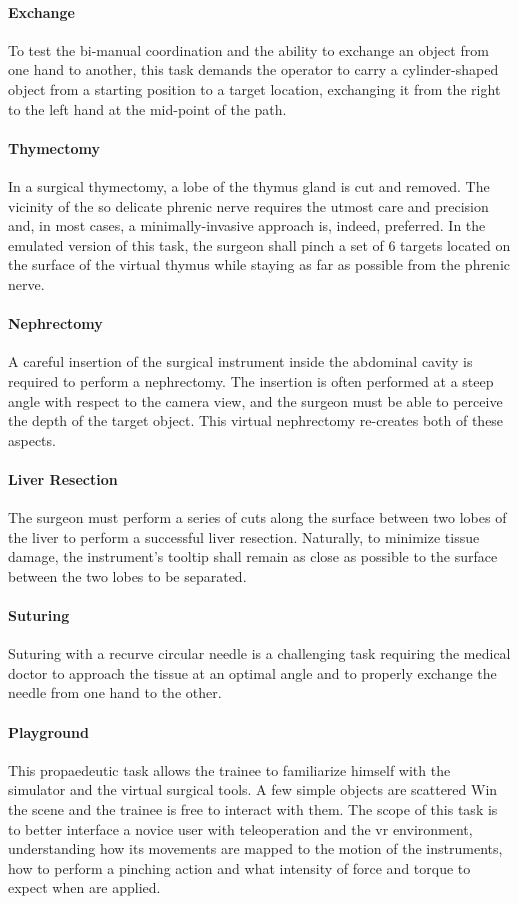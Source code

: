 \documentclass[../main.tex]{subfiles}
\begin{document}
\paragraph{Exchange} To test the bi-manual coordination and the ability to exchange an object from one hand to another, this task demands the operator to carry a cylinder-shaped object from a starting position to a target location, exchanging it from the right to the left hand at the mid-point of the path. 
\paragraph{Thymectomy} In a surgical thymectomy, a lobe of the thymus gland is cut and removed. The vicinity of the so delicate phrenic nerve requires the utmost care and precision and, in most cases, a minimally-invasive approach is, indeed, preferred. In the emulated version of this task, the surgeon shall pinch a set of 6 targets located on the surface of the virtual thymus while staying as far as possible from the phrenic nerve. 
\paragraph{Nephrectomy} A careful insertion of the surgical instrument inside the abdominal cavity is required to perform a nephrectomy. The insertion is often performed at a steep angle with respect to the camera view, and the surgeon must be able to perceive the depth of the target object. This virtual nephrectomy re-creates both of these aspects.
\paragraph{Liver Resection} The surgeon must perform a series of cuts along the surface between two lobes of the liver to perform a successful liver resection. Naturally, to minimize tissue damage, the instrument's tooltip shall remain as close as possible to the surface between the two lobes to be separated.
\paragraph{Suturing} Suturing with a recurve circular needle is a challenging task requiring the medical doctor to approach the tissue at an optimal angle and to properly exchange the needle from one hand to the other.  
\paragraph{Playground} This propaedeutic task allows the trainee to familiarize himself with the simulator and the virtual surgical tools. A few simple objects are scattered Win the scene and the trainee is free to interact with them. The scope of this task is to better interface a novice user with teleoperation and the \ac{vr} environment, understanding how its movements are mapped to the motion of the instruments, how to perform a pinching action and what intensity of force and torque to expect when \vfs are applied. 
\
\end{document}
